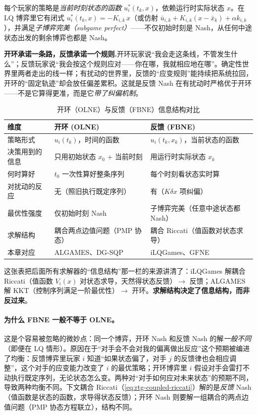 \begin{definition}\label{def:rtg-fbne}
每个玩家的策略是\emph{当前时刻状态的函数} $u_i^*(t_k,x)$，依赖运行时实际状态 $x$。在 LQ 博弈里它有闭式 $u_i^*(t_k,x)=-K_{i,k}\,x$（或仿射 $\bar u_{i,k}+K_{i,k}(x-\bar x_k)+\alpha k_{i,k}$），并满足\emph{子博弈完美（subgame perfect）}——不仅初始时刻是 Nash，从任何中途状态出发的剩余博弈也都是 Nash。
\end{definition}

\begin{insight}
\textbf{开环承诺一条路，反馈承诺一个规则.}\;开环玩家说“我会走这条线，不管发生什么”；反馈玩家说“我会按这个规则应对——你在哪，我就相应地在哪”。确定性世界里两者走出的线一样；有扰动的世界里，反馈的“应变规则”能持续把系统拉回，开环的“固定轨迹”却会放任偏差累积。这就是反馈 Nash 在有扰动时严格优于开环——不是它算得更准，而是它\emph{带了纠偏机制}。
\end{insight}

\begin{table}[H]\centering\small
\caption{开环（OLNE）与反馈（FBNE）信息结构对比}
\label{tab:rtg-olne-fbne}
\begin{tabular}{p{} p{} p{}}
\toprule
维度 & 开环 (OLNE) & 反馈 (FBNE) \\
\midrule
策略形式 & $u_i(t_k)$，时间的函数 & $u_i(t_k,x_k)$，当前状态的函数 \\
决策用到的信息 & 只用初始状态 $x_0$ + 当前时刻 & 用运行时实际状态 $x_k$ \\
何时算好 & $t_0$ 一次性算好整条序列 & 每个时刻看状态实时算 \\
对扰动的反应 & 无（照旧执行既定序列） & 有（$K\delta x$ 项纠偏） \\
最优性强度 & 仅初始时刻 Nash & 子博弈完美（任意中途状态都 Nash） \\
求解结构 & 耦合两点边值问题（PMP 协态） & 耦合 Riccati（值函数对状态求导） \\
本章对应 & ALGAMES、DG-SQP & iLQGames、GFNE \\
\bottomrule
\end{tabular}
\end{table}

\noindent 这张表把后面所有求解器的“信息结构”那一栏的来源讲清了：iLQGames 解耦合 Riccati（值函数 $V_i(x)$ 对状态求导，天然得状态反馈）$\to$ 反馈；ALGAMES 解 KKT（控制序列满足一阶最优性）$\to$ 开环。\textbf{求解结构决定了信息结构，而非反过来}。

\paragraph{为什么 FBNE 一般不等于 OLNE。}
这是个容易被忽略的微妙点：同一个博弈，开环 Nash 和反馈 Nash 的解\emph{一般不同}（即便在 LQ 情形）。原因在于“对手会不会对我的偏离做出反应”这个预期被编进了均衡：反馈博弈里玩家 $i$ 知道“如果状态偏了，对手 $j$ 的反馈律也会相应调整”，这个对手的应变能力改变了 $i$ 的最优策略；开环博弈里 $i$ 假设对手会雷打不动执行既定序列，无论状态怎么变。两种对“对手如何应对未来状态”的预期不同，导致两种均衡不同。下文耦合 Riccati（\cref{eq:rtg-coupled-riccati}）解的是\emph{反馈} Nash（值函数是状态的函数，求导得状态反馈）；开环 Nash 则要解一组耦合的两点边值问题（PMP 协态方程联立），结构不同。

